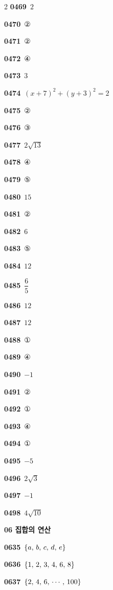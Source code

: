 \documentclass[10pt,a4paper]{article}
\begin{document}
\begin{multicols}{2}
\noindent\textbf{0469}\ $2$\par
\noindent\textbf{0470}\ ②\par
\noindent\textbf{0471}\ ②\par
\noindent\textbf{0472}\ ④\par
\noindent\textbf{0473}\ $3$\par
\noindent\textbf{0474}\ $(x+7)^2+(y+3)^2=2$\par
\noindent\textbf{0475}\ ②\par
\noindent\textbf{0476}\ ③\par
\noindent\textbf{0477}\ $2\sqrt{13}$\par
\noindent\textbf{0478}\ ④\par
\noindent\textbf{0479}\ ⑤\par
\noindent\textbf{0480}\ $15$\par
\noindent\textbf{0481}\ ②\par
\noindent\textbf{0482}\ $6$\par
\noindent\textbf{0483}\ ⑤\par
\noindent\textbf{0484}\ $12$\par
\noindent\textbf{0485}\ $\dfrac{6}{5}$\par
\noindent\textbf{0486}\ $12$\par
\noindent\textbf{0487}\ $12$\par
\noindent\textbf{0488}\ ①\par
\noindent\textbf{0489}\ ④\par
\noindent\textbf{0490}\ $-1$\par
\noindent\textbf{0491}\ ②\par
\noindent\textbf{0492}\ ①\par
\noindent\textbf{0493}\ ④\par
\noindent\textbf{0494}\ ①\par
\noindent\textbf{0495}\ $-5$\par
\noindent\textbf{0496}\ $2\sqrt{3}$\par
\noindent\textbf{0497}\ $-1$\par
\noindent\textbf{0498}\ $4\sqrt{10}$\par
\noindent\textbf{06 집합의 연산}\par\smallskip
\noindent\textbf{0635}\ $\{a,\mkern3mu b,\mkern3mu c,\mkern3mu d,\mkern3mu e\}$\par
\noindent\textbf{0636}\ $\{1,\mkern3mu 2,\mkern3mu 3,\mkern3mu 4,\mkern3mu 6,\mkern3mu 8\}$\par
\noindent\textbf{0637}\ $\{2,\mkern3mu 4,\mkern3mu 6,\mkern3mu \cdots,\mkern3mu 100\}$\par

\end{multicols}
\end{document}
